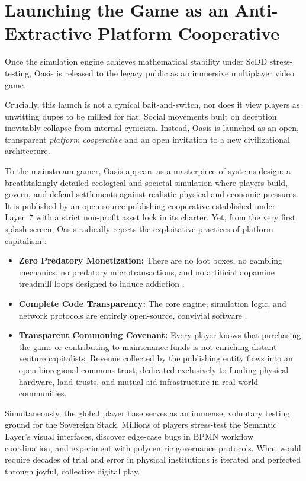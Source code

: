 \section{Launching the Game as an Anti-Extractive Platform Cooperative}

Once the simulation engine achieves mathematical stability under ScDD stress-testing, Oasis is released to the legacy public as an immersive multiplayer video game. 

Crucially, this launch is not a cynical bait-and-switch, nor does it view players as unwitting dupes to be milked for fiat. Social movements built on deception inevitably collapse from internal cynicism. Instead, Oasis is launched as an open, transparent \textit{platform cooperative} and an open invitation to a new civilizational architecture. 

To the mainstream gamer, Oasis appears as a masterpiece of systems design: a breathtakingly detailed ecological and societal simulation where players build, govern, and defend settlements against realistic physical and economic pressures. It is published by an open-source publishing cooperative established under Layer~7 with a strict non-profit asset lock in its charter. Yet, from the very first splash screen, Oasis radically rejects the exploitative practices of platform capitalism \parencite{zuboff2019}:
\begin{itemize}
    \item \textbf{Zero Predatory Monetization:} There are no loot boxes, no gambling mechanics, no predatory microtransactions, and no artificial dopamine treadmill loops designed to induce addiction \parencite{han2015}.
    \item \textbf{Complete Code Transparency:} The core engine, simulation logic, and network protocols are entirely open-source, convivial software \parencite{illich1973}.
    \item \textbf{Transparent Commoning Covenant:} Every player knows that purchasing the game or contributing to maintenance funds is not enriching distant venture capitalists. Revenue collected by the publishing entity flows into an open bioregional commons trust, dedicated exclusively to funding physical hardware, land trusts, and mutual aid infrastructure in real-world communities.
\end{itemize}

Simultaneously, the global player base serves as an immense, voluntary testing ground for the Sovereign Stack. Millions of players stress-test the Semantic Layer's visual interfaces, discover edge-case bugs in BPMN workflow coordination, and experiment with polycentric governance protocols. What would require decades of trial and error in physical institutions is iterated and perfected through joyful, collective digital play.


